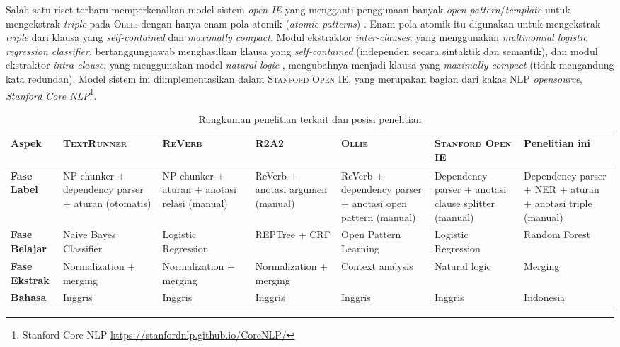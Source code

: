 Salah satu riset terbaru memperkenalkan model sistem \textit{open IE} yang mengganti penggunaan banyak \textit{open pattern}/\textit{template} untuk mengekstrak \textit{triple} pada \textsc{Ollie} \citep{schmitz2012open} dengan hanya enam pola atomik (\textit{atomic patterns}) \citep{angeli2015leveraging}. Enam pola atomik itu digunakan untuk mengekstrak \textit{triple} dari klausa yang \textit{self-contained} dan \textit{maximally compact}. Modul ekstraktor \textit{inter-clauses}, yang menggunakan \textit{multinomial logistic regression classifier}, bertanggungjawab menghasilkan klausa yang \textit{self-contained} (independen secara sintaktik dan semantik), dan modul ekstraktor \textit{intra-clause}, yang menggunakan model \textit{natural logic} \citep{maccartney2007natural}, mengubahnya menjadi klausa yang \textit{maximally compact} (tidak mengandung kata redundan). Model sistem ini diimplementasikan dalam \textsc{Stanford Open IE}, yang merupakan bagian dari kakas NLP \textit{opensource}, \textit{Stanford Core NLP}\footnote{Stanford Core NLP \url{https://stanfordnlp.github.io/CoreNLP/}}.

\begin{table}
\caption{Rangkuman penelitian terkait dan posisi penelitian}
\label{tab:related_works_summary}
{\footnotesize
\begin{tabular}{l >{\centering\arraybackslash}p{1.7cm} >{\centering\arraybackslash}p{1.7cm} >{\centering\arraybackslash}p{1.7cm} >{\centering\arraybackslash}p{1.7cm} >{\centering\arraybackslash}p{1.7cm} >{\centering\arraybackslash}p{1.7cm}}
	\hline 
	\textbf{Aspek} & \textbf{\textsc{TextRunner} \citep{banko2007open}} & \textbf{\textsc{ReVerb} \citep{fader2011identifying}} & \textbf{\textsc{R2A2} \citep{etzioni2011open}} & \textbf{\textsc{Ollie} \citep{schmitz2012open}} & \textbf{\textsc{Stanford Open IE} \citep{angeli2015leveraging}} & \textbf{Penelitian ini} \\ 
	\hline 
	\textbf{Fase Label} & NP chunker + dependency parser + aturan (otomatis)  & NP chunker + aturan + anotasi relasi (manual)  & ReVerb + anotasi  argumen (manual)  & ReVerb + dependency parser + anotasi open pattern (manual)  & Dependency parser + anotasi clause splitter (manual) & Dependency parser + NER + aturan + anotasi triple (manual) \\ 
	\hline
	\textbf{Fase Belajar} & Naive Bayes Classifier  & Logistic Regression  & REPTree + CRF  & Open Pattern Learning & Logistic Regression  & Random Forest  \\ 
	\hline
	\textbf{Fase Ekstrak} & Normalization + merging  & Normalization + merging  & Normalization + merging  & Context analysis & Natural logic  & Merging \\ 
	\hline
	\textbf{Bahasa} & Inggris  &  Inggris & Inggris  & Inggris  & Inggris  & Indonesia \\ 
	\hline 
\end{tabular}
} 
\end{table}

